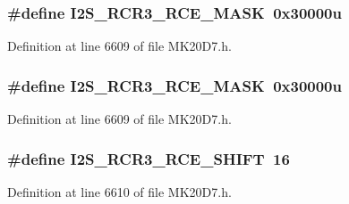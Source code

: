 \subsubsection[{\texorpdfstring{I2\+S\+\_\+\+R\+C\+R3\+\_\+\+R\+C\+E\+\_\+\+M\+A\+SK}{I2S_RCR3_RCE_MASK}}]{\setlength{\rightskip}{0pt plus 5cm}\#define I2\+S\+\_\+\+R\+C\+R3\+\_\+\+R\+C\+E\+\_\+\+M\+A\+SK~0x30000u}\hypertarget{group___i2_s___register___masks_ga1609ba1986cd2320ff34a1308599c93b}{}\label{group___i2_s___register___masks_ga1609ba1986cd2320ff34a1308599c93b}


Definition at line 6609 of file M\+K20\+D7.\+h.

\subsubsection[{\texorpdfstring{I2\+S\+\_\+\+R\+C\+R3\+\_\+\+R\+C\+E\+\_\+\+M\+A\+SK}{I2S_RCR3_RCE_MASK}}]{\setlength{\rightskip}{0pt plus 5cm}\#define I2\+S\+\_\+\+R\+C\+R3\+\_\+\+R\+C\+E\+\_\+\+M\+A\+SK~0x30000u}\hypertarget{group___i2_s___register___masks_ga1609ba1986cd2320ff34a1308599c93b}{}\label{group___i2_s___register___masks_ga1609ba1986cd2320ff34a1308599c93b}


Definition at line 6609 of file M\+K20\+D7.\+h.

\subsubsection[{\texorpdfstring{I2\+S\+\_\+\+R\+C\+R3\+\_\+\+R\+C\+E\+\_\+\+S\+H\+I\+FT}{I2S_RCR3_RCE_SHIFT}}]{\setlength{\rightskip}{0pt plus 5cm}\#define I2\+S\+\_\+\+R\+C\+R3\+\_\+\+R\+C\+E\+\_\+\+S\+H\+I\+FT~16}\hypertarget{group___i2_s___register___masks_ga1ed5dcaaac88cd06cfc10bb290c7f097}{}\label{group___i2_s___register___masks_ga1ed5dcaaac88cd06cfc10bb290c7f097}


Definition at line 6610 of file M\+K20\+D7.\+h.


